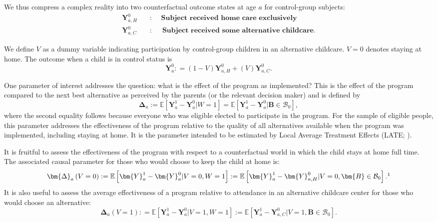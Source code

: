 We thus compress a complex reality into two counterfactual outcome states at age $a$ for control-group subjects:
\begin{align*}
\bm{Y}_{a,H}^0 \quad &: \quad \textbf{ Subject received home care exclusively} \\
\bm{Y}_{a,C}^0 \quad &: \quad \textbf{ Subject received some alternative childcare}.
\end{align*}

We define $V$ as a dummy variable indicating participation by control-group children in an alternative childcare. $V=0$ denotes staying at home. The outcome when a child is in control status is
\begin{equation}
\bm{Y}^0_a : = \left( 1 - V \right) \bm{Y}^0_{a,H} + \left( V \right) \bm{Y}^0_{a,C}. \label{eq:meandiff}
\end{equation}

One parameter of interest addresses the question: what is the effect of the program as implemented? This is the effect of the program compared to the next best alternative as perceived by the parents (or the relevant decision maker) and is defined by
\begin{equation}\label{eq:effect}
\bm{\Delta}_a := \mathbb{E} \left[ \bm{Y}^1_a -  \bm{Y}^0_a | W =1 \right] = \mathbb{E} \left[\bm{Y}^1_a - \bm{Y}^0_a | \bm{B} \in \mathcal{B}_0 \right],
\end{equation}
where the second equality follows because everyone who was eligible elected to participate in the program. For the sample of eligible people, this parameter addresses the effectiveness of the program relative to the quality of all alternatives available when the program was implemented, including staying at home. It is the parameter intended to be estimated by Local Average Treatment Effects (LATE; \citealp{Imbens_Angrist_1994_Econometrica}).

It is fruitful to assess the effectiveness of the program with respect to a counterfactual world in which the child stays at home full time. The associated causal parameter for those who would choose to keep the child at home is:
\begin{equation}\label{eq:influenza}
\bm{\Delta}_a \left(V = 0 \right) : =   \mathbb{E} \left[ \bm{Y}^1_a - \bm{Y}^0_a | V = 0, W = 1 \right] := \mathbb{E} \left[\bm{Y}^1_{a} - \bm{Y}^0_{a,H} | V = 0, \bm{B} \in \mathcal{B}_0 \right].\footnote{Appendix~\ref{appendix:vsensitivity-controlsub} displays results with alternative definitions of $V$ (i.e., different thresholds define if a child attended alternative childcare). The results are robust to the various definitions. What matters is whether any out-of-home child care is being used ($V>0$), and not the specific value of $V$.}
\end{equation}
It is also useful to assess the average effectiveness of a program relative to attendance in an alternative childcare center for those who would choose an alternative:
\begin{equation}\label{eq:smallpox}
\bm{\Delta}_a \left( V =1 \right) : =   \mathbb{E} \left[ \bm{Y}^1_a - \bm{Y}^0_a | V = 1, W = 1 \right] := \mathbb{E} \left[\bm{Y}^1_a - \bm{Y}^0_{a,C} | V = 1, \bm{B} \in \mathcal{B}_0 \right].
\end{equation}

